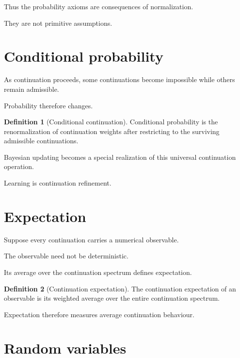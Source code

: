 \documentclass[13pt,openany]{book}
\theoremstyle{plain}
\theoremstyle{definition}
\newtheorem{definition}{Definition}[chapter]
\begin{document}
Thus the probability axioms are consequences of normalization.

They are not primitive assumptions.

\section{Conditional probability}

As continuation proceeds, some continuations become impossible while others
remain admissible.

Probability therefore changes.

\begin{definition}[Conditional continuation]
Conditional probability is the renormalization of continuation weights after
restricting to the surviving admissible continuations.
\end{definition}

Bayesian updating becomes a special realization of this universal continuation
operation.

Learning is continuation refinement.

\section{Expectation}

Suppose every continuation carries a numerical observable.

The observable need not be deterministic.

Its average over the continuation spectrum defines expectation.

\begin{definition}[Continuation expectation]
The continuation expectation of an observable is its weighted average over the
entire continuation spectrum.
\end{definition}

Expectation therefore measures average continuation behaviour.

\section{Random variables}
\end{document}
